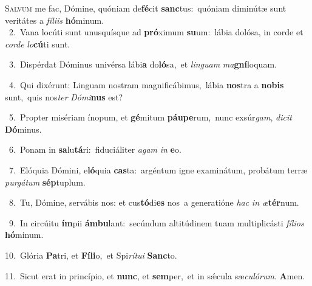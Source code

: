 \lettrine{\initial\textcolor{\initialcolor}{S}}{alvum} me fac, Dómine, quóniam de\-\textbf{fé}\-cit \textbf{sanc}\-tus:~\star quóniam diminútæ sunt veritátes a \textit{fí}\-\textit{li}\textit{is} \textbf{hó}\-minum.\\
{\numbfont\textcolor{\numbcolor}{~2.}}~Vana locúti sunt unusquísque ad \textbf{pró}\-ximum \textbf{su}\-um:~\star lábia dolósa, in corde et \textit{cor}\-\textit{de} \textit{lo}\-\textbf{cú}ti sunt.\par
{\numbfont\textcolor{\numbcolor}{~3.}}~Dispérdat Dóminus univérsa lábi\textbf{a} do\-\textbf{ló}\-sa,~\star et \textit{lin}\-\textit{guam} \textit{ma}\-\textbf{gní}loquam.\par
{\numbfont\textcolor{\numbcolor}{~4.}}~Qui dixérunt: Linguam nostram magnificábimus,~\dagger lábia \textbf{nos}\-tra a \textbf{no}\-\textbf{bis} sunt,~\star quis nos\textit{ter} \textit{Dó}\-\textit{mi}\textbf{nus} est?\par
{\numbfont\textcolor{\numbcolor}{~5.}}~Propter misériam ínopum, et \textbf{gé}\-mitum \textbf{páu}\-\textbf{pe}rum,~\star nunc exsúr\-\textit{gam}\-, \textit{di}\-\textit{cit} \textbf{Dó}\-minus.\par
{\numbfont\textcolor{\numbcolor}{~6.}}~Ponam in \textbf{sa}\-lu\-\textbf{tá}\-ri:~\star fiduciáliter \textit{a}\-\textit{gam} \textit{in} \textbf{e}\-o.\par
{\numbfont\textcolor{\numbcolor}{~7.}}~Elóquia Dómini, e\-\textbf{ló}\-quia \textbf{cas}\-ta:~\star argéntum igne examinátum, probátum terræ \textit{pur}\-\textit{gá}\textit{tum} \textbf{sép}\-tuplum.\par
{\numbfont\textcolor{\numbcolor}{~8.}}~Tu, Dómine, servábis nos: et cus\-\textbf{tó}\-di\textbf{es} nos~\star a generatióne \textit{hac} \textit{in} \textit{æ}\-\textbf{tér}num.\par
{\numbfont\textcolor{\numbcolor}{~9.}}~In circúitu \textbf{ím}\-pii \textbf{ám}\-\textbf{bu}lant:~\star secúndum altitúdinem tuam multiplicásti \textit{fí}\-\textit{li}\textit{os} \textbf{hó}\-minum.\par
{\numbfont\textcolor{\numbcolor}{10.}}~Glória \textbf{Pa}\-tri, et \textbf{Fí}\-\textbf{li}o,~\star et Spi\-\textit{rí}\-\textit{tu}\textit{i} \textbf{Sanc}\-to.\par
{\numbfont\textcolor{\numbcolor}{11.}}~Sicut erat in princípio, et \textbf{nunc}\-, et \textbf{sem}\-per,~\star et in sǽcula sæ\-\textit{cu}\-\textit{ló}\textit{rum}. \textbf{A}\-men.\par
